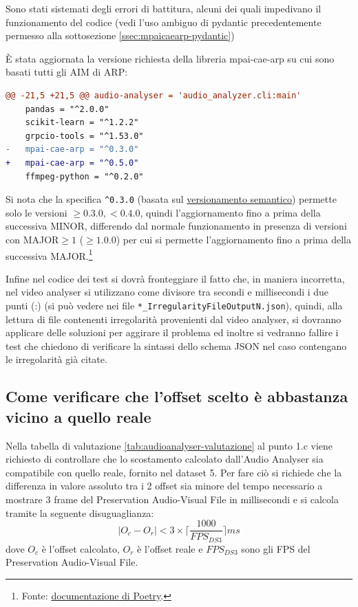 Sono stati sistemati degli errori di battitura, alcuni dei quali impedivano il funzionamento del codice (vedi l'uso ambiguo di pydantic precedentemente permesso alla sottosezione \ref{ssec:mpaicaearp-pydantic})

È stata aggiornata la versione richiesta della libreria mpai-cae-arp su cui sono basati tutti gli \ac{AIM} di \ac{ARP}:
\begin{lstlisting}[language=diff]
@@ -21,5 +21,5 @@ audio-analyser = 'audio_analyzer.cli:main'
    pandas = "^2.0.0"
    scikit-learn = "^1.2.2"
    grpcio-tools = "^1.53.0"
-   mpai-cae-arp = "^0.3.0"
+   mpai-cae-arp = "^0.5.0"
    ffmpeg-python = "^0.2.0"
\end{lstlisting}
Si nota che la specifica \verb|^0.3.0| (basata sul \href{https://semver.org/lang/it/}{versionamento semantico}) permette solo le versioni $\ge0.3.0, <0.4.0$, quindi l'aggiornamento fino a prima della successiva MINOR, differendo dal normale funzionamento in presenza di versioni con MAJOR$\ge1$ ($\ge1.0.0$) per cui si permette l'aggiornamento fino a prima della successiva MAJOR.\footnote{Fonte: \href{https://python-poetry.org/docs/dependency-specification/\#caret-requirements}{documentazione di Poetry}.}

Infine nel codice dei test si dovrà fronteggiare il fatto che, in maniera incorretta, nel video analyser si utilizzano come divisore tra secondi e millisecondi i due punti (:) (si può vedere nei file \verb|*_IrregularityFileOutputN.json|), quindi, alla lettura di file contenenti irregolarità provenienti dal video analyser, si dovranno applicare delle soluzioni per aggirare il problema ed inoltre si vedranno fallire i test che chiedono di verificare la sintassi dello schema JSON nel caso contengano le irregolarità già citate.


\subsection{Come verificare che l'offset scelto è abbastanza vicino a quello reale} \label{ssec:audioanalyser-offset}   %
Nella tabella di valutazione \ref{tab:audioanalyser-valutazione} al punto 1.c viene richiesto di controllare che lo scostamento calcolato dall'Audio Analyser sia compatibile con quello reale, fornito nel dataset 5.
Per fare ciò si richiede che la differenza in valore assoluto tra i 2 offset sia minore del tempo necessario a mostrare 3 frame del Preservation Audio-Visual File in millisecondi e si calcola tramite la seguente disuguaglianza:
\begin{equation}
    |O_c - O_r| < 3 \times \lceil\frac{1000}{FPS_{DS3}}\rceil ms
\end{equation}
dove $O_c$ è l'offset calcolato, $O_r$ è l'offset reale e $FPS_{DS3}$ sono gli FPS del Preservation Audio-Visual File.

